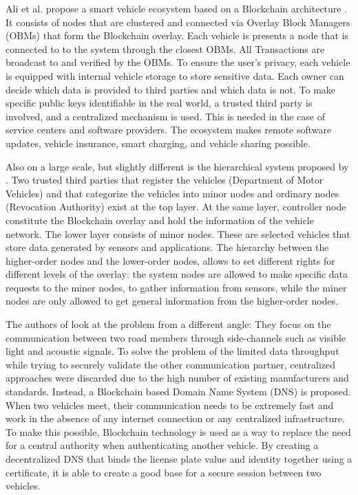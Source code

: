 Ali et al. propose a smart vehicle ecosystem based on a Blockchain architecture \cite{DorriSteger2017}. It consists of nodes that are clustered and connected via Overlay Block Managers (OBMs) that form the Blockchain overlay. Each vehicle is presents a node that is connected to to the system through the closest OBMs. All Transactions are broadcast to and verified by the OBMs.
To ensure the user's privacy, each vehicle is equipped with internal vehicle storage to store sensitive data. Each owner can decide which data is provided to third parties and which data is not.
To make specific public keys identifiable in the real world, a trusted third party is involved, and a centralized mechanism is used. This is needed in the case of service centers and software providers. The ecosystem makes remote software updates, vehicle insurance, smart charging, and vehicle sharing possible.

Also on a large scale, but slightly different is the hierarchical system proposed by \cite{Sharma2017}. Two trusted third parties that register the vehicles (Department of Motor Vehicles) and that categorize the vehicles into minor nodes and ordinary nodes (Revocation Authority) exist at the top layer. At the same layer, controller node constitute the Blockchain overlay and hold the information of the vehicle network. The lower layer consists of minor nodes. These are selected vehicles that store data generated by sensors and applications.
The hierarchy between the higher-order nodes and the lower-order nodes, allows to set different rights for different levels of the overlay: the system nodes are allowed to make specific data requests to the miner nodes, to gather information from sensors, while the miner nodes are only allowed to get general information from the higher-order nodes.

The authors of \cite{Rowan2017} look at the problem from a different angle: They focus on the communication between two road members through side-channels such as visible light and acoustic signals. To solve the problem of the limited data throughput while trying to securely validate the other communication partner, centralized approaches were discarded due to the high number of existing manufacturers and standards. Instead, a Blockchain based Domain Name System (DNS) is proposed.
When two vehicles meet, their communication needs to be extremely fast and work in the absence of any internet connection or any centralized infrastructure.
To make this possible, Blockchain technology is used as a way to replace the need for a central authority when authenticating another vehicle. By creating a decentralized DNS that binds the license plate value and identity together using a certificate, it is able to create a good base for a secure session between two vehicles.

